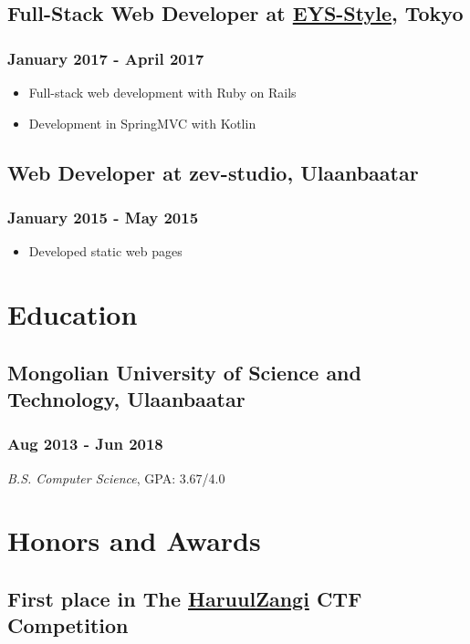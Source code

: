\documentclass[letterpaper]{article}
\begin{document}
\subsection{Full-Stack Web Developer at \href{http:www.eys-style.com}{EYS-Style}, Tokyo}
\label{sec:org2098924}
\subsubsection{January 2017 - April 2017}
\label{sec:org3345cd7}
\begin{itemize}
\item Full-stack web development with Ruby on Rails
\item Development in SpringMVC with Kotlin
\end{itemize}
\subsection{Web Developer at zev-studio, Ulaanbaatar}
\label{sec:org1e935eb}
\subsubsection{January 2015 - May 2015}
\label{sec:org5aad18c}
\begin{itemize}
\item Developed static web pages
\end{itemize}
\section{Education}
\label{sec:org6428729}
\subsection{Mongolian University of Science and Technology, Ulaanbaatar}
\label{sec:org792529f}
\subsubsection{Aug 2013 - Jun 2018}
\label{sec:org35ac188}
\emph{B.S. Computer Science}, GPA: 3.67/4.0
\section{Honors and Awards}
\label{sec:org37c426e}
\subsection{First place in The \href{http:www.haruulzangi.mn}{HaruulZangi} CTF Competition}
\label{sec:org61cf520}
\end{document}
